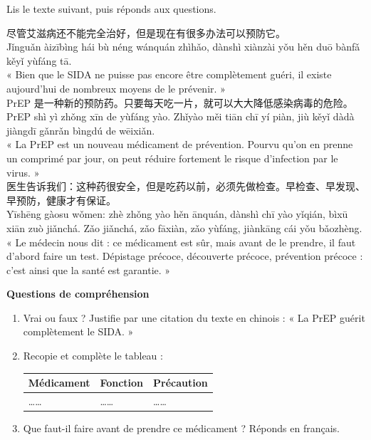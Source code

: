 \documentclass[11pt]{article}
\begin{document}
\begin{exercice}
Lis le texte suivant, puis réponds aux questions.

\begin{textebox}
尽管艾滋病还不能完全治好，但是现在有很多办法可以预防它。\\[2pt]
Jǐnguǎn àizībìng hái bù néng wánquán zhìhǎo, dànshì xiànzài yǒu hěn duō bànfǎ kěyǐ yùfáng tā.\\[2pt]
« Bien que le SIDA ne puisse pas encore être complètement guéri, il existe aujourd'hui de nombreux moyens de le prévenir. »\\[4pt]
PrEP 是一种新的预防药。只要每天吃一片，就可以大大降低感染病毒的危险。\\[2pt]
PrEP shì yì zhǒng xīn de yùfáng yào. Zhǐyào měi tiān chī yí piàn, jiù kěyǐ dàdà jiàngdī gǎnrǎn bìngdú de wēixiǎn.\\[2pt]
« La PrEP est un nouveau médicament de prévention. Pourvu qu'on en prenne un comprimé par jour, on peut réduire fortement le risque d'infection par le virus. »\\[4pt]
医生告诉我们：这种药很安全，但是吃药以前，必须先做检查。早检查、早发现、早预防，健康才有保证。\\[2pt]
Yīshēng gàosu wǒmen: zhè zhǒng yào hěn ānquán, dànshì chī yào yǐqián, bìxū xiān zuò jiǎnchá. Zǎo jiǎnchá, zǎo fāxiàn, zǎo yùfáng, jiànkāng cái yǒu bǎozhèng.\\[2pt]
« Le médecin nous dit : ce médicament est sûr, mais avant de le prendre, il faut d'abord faire un test. Dépistage précoce, découverte précoce, prévention précoce : c'est ainsi que la santé est garantie. »
\end{textebox}

\textbf{Questions de compréhension}
\begin{enumerate}
\item Vrai ou faux ? Justifie par une citation du texte en chinois : « La PrEP guérit complètement le SIDA. »
\item Recopie et complète le tableau : \begin{center}\begin{tabularx}{\linewidth}{|X|X|X|}\hline
\rowcolor{popblueL} Médicament & Fonction & Précaution \\ \hline
\ldots\ldots & \ldots\ldots & \ldots\ldots \\ \hline
\end{tabularx}\end{center}
\item Que faut-il faire avant de prendre ce médicament ? Réponds en français.
\end{enumerate}


\end{exercice}
\end{document}
